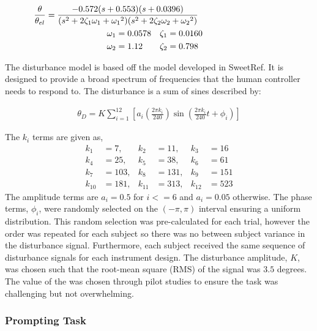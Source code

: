 \begin{align}
    \mathclap{ %
        \frac{\theta}{\theta_{el}}
        =
        \frac{
            -0.572 (s+0.553) (s+0.0396)
        }{
            (s^2 + 2\zeta_1 \omega_1 + {\omega_1}^2)
            (s^2 + 2\zeta_2 \omega_2 + {\omega_2}^2)
        }
    }\\
    \omega_1 &= 0.0578 & \zeta_1 &= 0.0160 \nonumber \\
    \omega_2 &= 1.12 & \zeta_2 &= 0.798 \nonumber
\end{align}

The disturbance model is based off the model developed in SweetRef\cite{sweet}.
It is designed to provide a broad spectrum of frequencies that the human controller needs to respond to.
The disturbance is a sum of sines described by:

\begin{align}
    \theta_D = K\sum\limits_{i=1}^{12} \left[ a_i \left(\frac{2\pi k_i}{240} \right) \sin\left( \frac{2\pi k_i}{240}t + \phi_i \right) \right]
\end{align}

The $k_i$ terms are given as,
\begin{align*}
    k_1 &= 7, & k_2 &= 11, & k_3 &= 16 \\
    k_4 &= 25, & k_5 &= 38, & k_6 &= 61 \\
    k_7 &= 103, & k_8 &= 131, & k_9 &= 151 \\
    k_{10} &= 181, & k_{11} &= 313, & k_{12} &= 523
\end{align*}
The amplitude terms are $a_i=0.5$ for $i <= 6$ and $a_i=0.05$ otherwise.
The phase terms, $\phi_i$, were randomly selected on the $(-\pi, \pi)$ interval ensuring a uniform distribution.
This random selection was pre-calculated for each trial, however the order was repeated for each subject so there was no between subject variance in the disturbance signal.
Furthermore, each subject received the same sequence of disturbance signals for each instrument design.
The disturbance amplitude, $K$, was chosen such that the root-mean square (RMS) of the signal was $3.5$ degrees.
The value of the was chosen through pilot studies to ensure the task was challenging but not overwhelming.

\subsubsection{Prompting Task}

